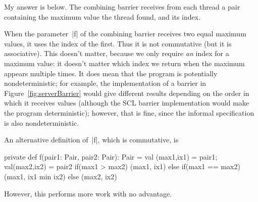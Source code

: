 \begin{answerS}
My answer is below.  The combining barrier receives from each thread a pair
containing the maximum value the thread found, and its index. 
%

When the parameter~|f| of the combining barrier receives two equal maximum
values, it uses the index of the first.  Thus it is not commutative (but it is
associative).  This doesn't matter, because we only require \emph{an} index
for a maximum value: it doesn't matter which index we return when the maximum
appears multiple times.  It does mean that the program is potentially
nondeterministic; for example, the implementation of a barrier in
Figure~\ref{fig:serverBarrier} would give different results depending on the
order in which it receives values (although the SCL barrier implementation
would make the program deterministic); however, that is fine, since the
informal specification is also nondeterministic.

An alternative definition of~|f|, which is commutative, is
%
\begin{scala}
  private def f(pair1: Pair, pair2: Pair): Pair = {
    val (max1,ix1) = pair1; val(max2,ix2) = pair2
    if(max1 > max2) (max1, ix1) 
    else if(max1 == max2) (max1, ix1 min ix2) 
    else (max2, ix2)
  }
\end{scala}
%
However, this performs more work with no advantage.
\end{answerS}
